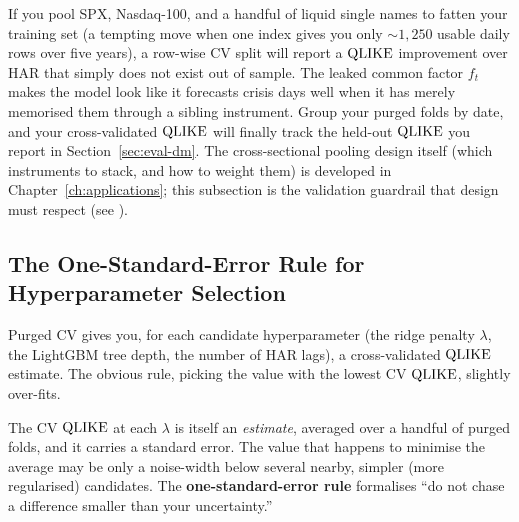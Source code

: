 \begin{projectconnection}
If you pool SPX, Nasdaq-100, and a handful of liquid single names to fatten your training set (a tempting move when one index gives you only ${\sim}1{,}250$ usable daily rows over five years), a row-wise CV split will report a $\operatorname{QLIKE}$ improvement over HAR that simply does not exist out of sample.
The leaked common factor $f_t$ makes the model look like it forecasts crisis days well when it has merely memorised them through a sibling instrument.
Group your purged folds by date, and your cross-validated $\operatorname{QLIKE}$ will finally track the held-out $\operatorname{QLIKE}$ you report in Section~\ref{sec:eval-dm}.
The cross-sectional pooling design itself (which instruments to stack, and how to weight them) is developed in Chapter~\ref{ch:applications}; this subsection is the validation guardrail that design must respect (see ).
\end{projectconnection}


\subsection{The One-Standard-Error Rule for Hyperparameter Selection}
\label{sec:eval-one-se}

Purged CV gives you, for each candidate hyperparameter (the ridge penalty $\lambda$, the LightGBM tree depth, the number of HAR lags), a cross-validated $\operatorname{QLIKE}$ estimate.
The obvious rule, picking the value with the lowest CV $\operatorname{QLIKE}$, slightly over-fits.

The CV $\operatorname{QLIKE}$ at each $\lambda$ is itself an \emph{estimate}, averaged over a handful of purged folds, and it carries a standard error.
The value that happens to minimise the average may be only a noise-width below several nearby, simpler (more regularised) candidates.
The \textbf{one-standard-error rule} formalises ``do not chase a difference smaller than your uncertainty.''


